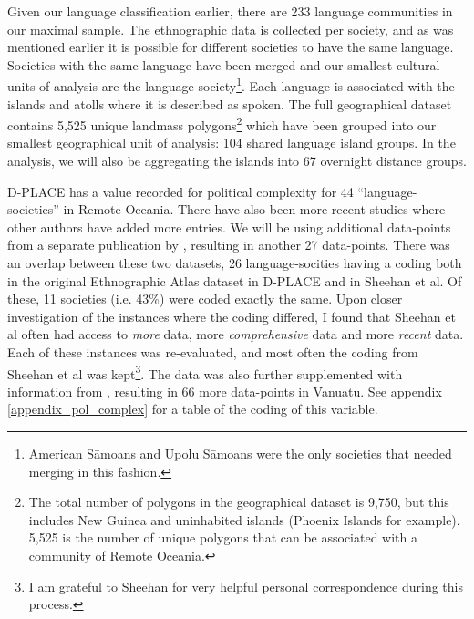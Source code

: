 \documentclass[12pt,letterpaper]{article}
\begin{document}
Given our language classification earlier, there are 233 language communities in our maximal sample. The ethnographic data is collected per society, and as was mentioned earlier it is possible for different societies to have the same language. Societies with the same language have been merged and our smallest cultural units of analysis are the language-society\footnote{American S\={a}moans and Upolu S\={a}moans were the only societies that needed merging in this fashion.}. Each language is associated with the islands and atolls where it is described as spoken. The full geographical dataset contains 5,525 unique landmass polygons\footnote{The total number of polygons in the geographical dataset is 9,750, but this includes New Guinea and uninhabited islands (Phoenix Islands for example). 5,525 is the number of unique polygons that can be associated with a community of Remote Oceania.} which have been grouped into our smallest geographical unit of analysis: 104 shared language island groups. In the analysis, we will also be aggregating the islands into 67 overnight distance groups.

D-PLACE has a value recorded for political complexity for 44 ``language-societies'' in Remote Oceania. There have also been more recent studies where other authors have added more entries. We will be using additional data-points from a separate publication by \citet{sheehan2018coevolution}, resulting in another 27 data-points. There was an overlap between these two datasets, 26 language-socities having a coding both in the original Ethnographic Atlas dataset in D-PLACE and in Sheehan et al. Of these, 11 societies (i.e. 43\%) were coded exactly the same. Upon closer investigation of the instances where the coding differed, I found that Sheehan et al often had access to \textit{more} data, more \textit{comprehensive} data and more \textit{recent} data. Each of these instances was re-evaluated, and most often the coding from Sheehan et al was kept\footnote{I am grateful to Sheehan for very helpful personal correspondence during this process.}. The data was also further supplemented with information from \citet[201]{bonnemaison1996graded}, resulting in 66 more data-points in Vanuatu. See appendix \ref{appendix_pol_complex} for a table of the coding of this variable.

\end{document}
